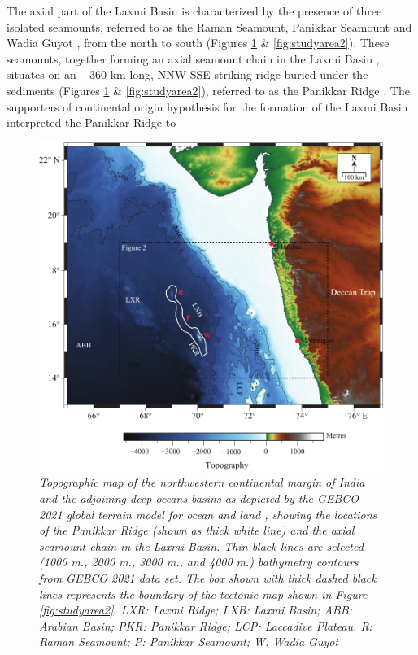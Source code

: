 \documentclass[twocolumn]{article}
\begin{document}
The axial part of the Laxmi Basin is characterized by the presence of three isolated seamounts, referred to as the Raman Seamount, Panikkar Seamount and Wadia Guyot \citep{Bhattacharya1994b}, from the north to south (Figures \ref{fig:studyarea} \& \ref{fig:studyarea2}). These seamounts, together forming an axial seamount chain in the Laxmi Basin \citep{Bhattacharya1994b}, situates on an ~ 360 km long, NNW-SSE striking ridge buried under the sediments (Figures \ref{fig:studyarea} \& \ref{fig:studyarea2}), referred to as the Panikkar Ridge \citep{Gopala_Rao1992}. The supporters of continental origin hypothesis for the formation of the Laxmi Basin interpreted the Panikkar Ridge to\begin{figure}[!htb]
	\centering
	\includegraphics[width=0.85\linewidth]{studyarea-bathy.pdf}
	\caption{
\textsl{	Topographic map of the northwestern continental margin of India and the adjoining deep oceans basins as depicted by the GEBCO 2021 global terrain model for ocean and land \citep{GEBCO_Compilation_Group2021}, showing the locations of the Panikkar Ridge (shown as thick white line) and the axial seamount chain in the Laxmi Basin. Thin black lines are selected (1000 m., 2000 m., 3000 m., and 4000 m.) bathymetry contours from GEBCO 2021 data set. The box shown with thick dashed black lines represents the boundary of the tectonic map shown in Figure \ref{fig:studyarea2}. LXR: Laxmi Ridge; LXB: Laxmi Basin; ABB: Arabian Basin; PKR: Panikkar Ridge; LCP: Laccadive Plateau. R: Raman Seamount; P: Panikkar Seamount; W: Wadia Guyot}
	}
	\label{fig:studyarea}

\end{figure}
\end{document}
